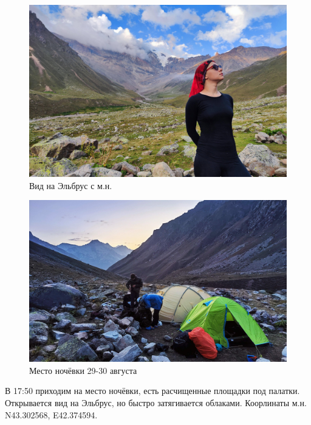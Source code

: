 \begin{figure}[h!]
	\centering
	\includegraphics[width=0.7\linewidth]{../pics/IMG_20240829_181353.jpg}
	\caption{Вид на Эльбрус с м.н.}
	\label{fig:IMG_20240829_184033}
\end{figure}


\begin{figure}[h!]
	\centering
	\includegraphics[width=0.7\linewidth]{../pics/IMG_20240829_191225.jpg}
	\caption{Место ночёвки 29-30 августа}
	\label{fig:IMG_20240829_191225.jpg}
\end{figure}

В 17:50 приходим на место ночёвки, есть расчищенные площадки под палатки. Открывается вид на Эльбрус, но быстро затягивается облаками. Коорлинаты м.н. N43.302568\degree, E42.374594\degree.


\clearpage